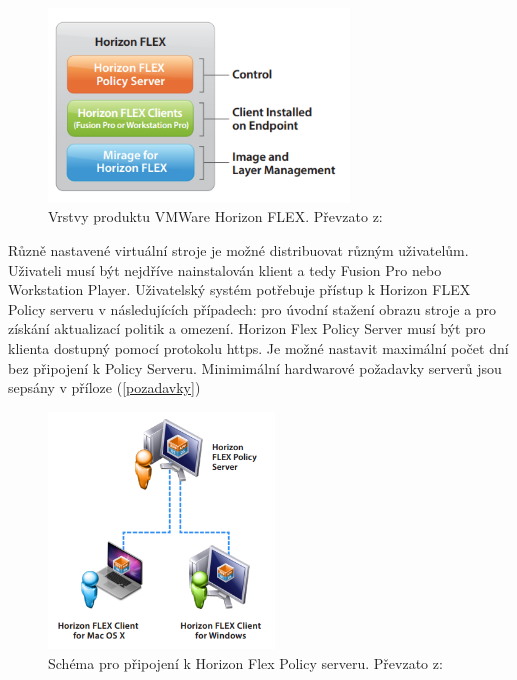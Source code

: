  \begin{figure}[h!]
 \centering
\includegraphics[width=8cm]{img/FlexVrstvy}
\caption{Vrstvy produktu VMWare Horizon FLEX. Převzato z: \cite{FlexBrief}} 
\label{FlexVrstvy}
\end{figure}%



Různě nastavené virtuální stroje je možné distribuovat různým uživatelům. Uživateli musí být nejdříve nainstalován klient a tedy Fusion Pro nebo Workstation Player. Uživatelský systém potřebuje přístup k Horizon FLEX Policy serveru v následujících případech: pro úvodní stažení obrazu stroje a pro získání aktualizací politik a omezení. Horizon Flex Policy Server musí být pro klienta dostupný pomocí protokolu https. Je možné nastavit maximální počet dní bez připojení k Policy Serveru. Minimimální hardwarové požadavky serverů jsou sepsány v příloze (\ref{pozadavky})


 \begin{figure}[h!]\label{FlexPolicy}
 \centering
\includegraphics[width=6cm]{img/FlexPolicy}
\caption{Schéma pro připojení k Horizon Flex Policy serveru. Převzato z: \cite{FlexBrief}}
\end{figure}%


